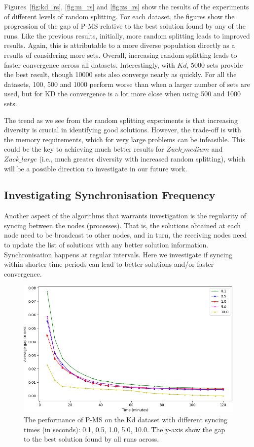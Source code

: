 \documentclass[authoryear,11pt,square,number,times,super,comma]{elsarticle}
\begin{document}
Figures~\ref{fig:kd_rs}, \ref{fig:m_rs} and \ref{fig:zs_rs} show the results of the experiments of different levels of random splitting. For each dataset, the figures show the progression of the gap of P-MS relative to the best solution found by any of the runs. Like the previous results, initially, more random splitting leads to improved results. Again, this is attributable to a more diverse population directly as a results of considering more sets. Overall, increasing random splitting leads to faster convergence across all datasets. Interestingly, with $Kd$, 5000 sets provide the best result, though 10000 sets also converge nearly as quickly. For all the datasets, 100, 500 and 1000 perform worse than when a larger number of sets are used, but for KD the convergence is a lot more close when using 500 and 1000 sets.

The trend as we see from the random splitting experiments is that increasing diversity is crucial in identifying good solutions. However, the trade-off is with the memory requirements, which for very large problems can be infeasible. This could be the key to achieving much better results for $Zuck\_medium$ and $Zuck\_large$ (i.e., much greater diversity with increased random splitting), which will be a possible direction to investigate in our future work. 

\subsection{Investigating Synchronisation Frequency}

Another aspect of the algorithms that warrants investigation is the regularity of syncing between the nodes (processes). That is, the solutions obtained at each node need to be broadcast to other nodes, and in turn, the receiving nodes need to update the list  of solutions with any better solution information. Synchronisation happens at regular intervals. Here we investigate if syncing within shorter time-periods can lead to better solutions and/or faster convergence.  

\begin{figure}[htbp]
  \includegraphics[width=14cm]{kd_sync}
  \centering
  \caption{The performance of P-MS on the Kd dataset with different syncing times (in seconds): 0.1, 0.5, 1.0, 5.0, 10.0. The y-axis show the gap to the best solution found by all runs across.}
  \label{fig:kd_sync}
\end{figure}
\end{document}
